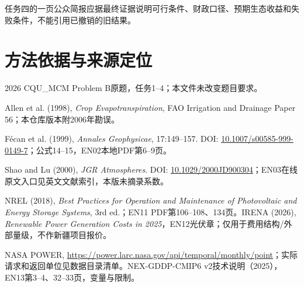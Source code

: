 \documentclass[11pt,a4paper]{ctexart}
\begin{document}
任务四的一页公众简报应据最终证据说明可行条件、财政口径、预期生态收益和失败条件，不能引用已撤销的旧结果。

\section*{方法依据与来源定位}
\begin{enumerate}[label={[\arabic*]}]
\item 2026 CQU\_MCM Problem B原题，任务1--4；本文件未改变题目要求。
\item Allen et al. (1998), \emph{Crop Evapotranspiration}, FAO Irrigation and Drainage Paper 56；本仓库版本附2006年勘误。
\item F\'ecan et al. (1999), \emph{Annales Geophysicae}, 17:149--157. DOI: \href{https://doi.org/10.1007/s00585-999-0149-7}{10.1007/s00585-999-0149-7}；公式14--15，EN02本地PDF第6--9页。
\item Shao and Lu (2000), \emph{JGR Atmospheres}. DOI: \href{https://doi.org/10.1029/2000JD900304}{10.1029/2000JD900304}；EN03在线原文入口见英文文献索引，本版未摘录系数。
\item NREL (2018), \emph{Best Practices for Operation and Maintenance of Photovoltaic and Energy Storage Systems}, 3rd ed.；EN11 PDF第106--108、134页。IRENA (2026), \emph{Renewable Power Generation Costs in 2025}，EN12光伏章；仅用于费用结构/外部量级，不作新疆项目报价。
\item NASA POWER, \url{https://power.larc.nasa.gov/api/temporal/monthly/point}；实际请求和返回单位见数据目录清单。NEX-GDDP-CMIP6 v2技术说明（2025），EN13第3--4、32--33页，变量与限制。
\end{enumerate}
\end{document}
